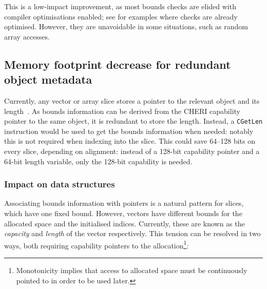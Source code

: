 \documentclass[dissertation.tex]{subfiles}
\begin{document}
This is a low-impact improvement, as most bounds checks are elided with
compiler optimisations enabled; see  for examples
where checks are already optimised.
However, they are unavoidable in some situations, such as random array
accesses.


\subsection{Memory footprint decrease for redundant object metadata}
\label{sec:eval-rust-memfoot}

Currently, any vector or array slice stores a pointer to the relevant
object and its length~\cite{blandy-orendorff}.
As bounds information can be derived from the CHERI capability pointer
to the same object, it is redundant to store the length.
Instead, a \texttt{CGetLen} instruction would be used to get the bounds
information when needed: notably this is not required when indexing into
the slice.
This could save 64--128 bits on every slice, depending on alignment:
instead of a 128-bit capability pointer and a 64-bit length variable,
only the 128-bit capability is needed.


\subsubsection{Impact on data structures}
Associating bounds information with pointers is a natural pattern for
slices, which have one fixed bound.
However, vectors have different bounds for the allocated space and the
initialised indices.
Currently, these are known as the \emph{capacity} and \emph{length} of
the vector respectively.
This tension can be resolved in two ways, both requiring capability
pointers to the allocation\footnote{
Monotonicity implies that access to allocated space must be continuously
pointed to in order to be used later.
}:
\end{document}
